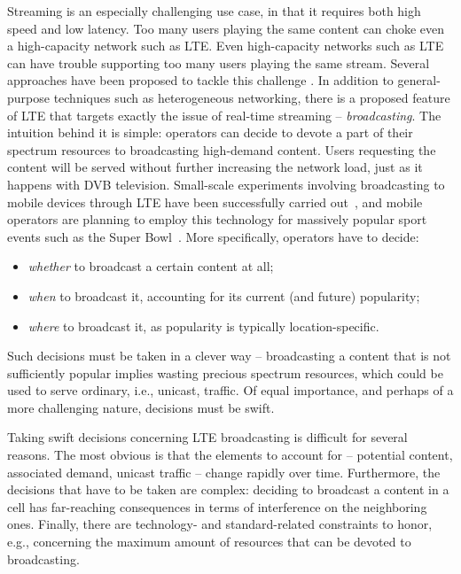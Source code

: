 \documentclass[10pt, conference, compsocconf]{IEEEtran}
\numberwithin{equation}{section}
\begin{document}
Streaming is an especially challenging use case, in that it requires both high speed and low latency. Too many
users playing the same content can choke even a high-capacity network such as LTE. Even high-capacity networks
such as LTE can have trouble supporting too many users playing the same stream.
Several approaches have been proposed to tackle this challenge \cite{noi-infocom14,hetnets}. 
In addition to general-purpose techniques such as heterogeneous networking, there is a proposed feature of LTE
that targets exactly the issue of real-time streaming -- {\em broadcasting}. The intuition behind it is simple:
operators can decide to devote a part of their spectrum resources to broadcasting high-demand content. Users
requesting the content will be served without further increasing the network load, just as it happens with
DVB television. Small-scale experiments involving broadcasting to mobile devices through LTE
have been successfully carried out~\cite{superbowl}, and mobile operators are planning to employ this technology
for massively popular sport events such as the Super Bowl~\cite{superbowl}. More specifically, operators have to decide:
\begin{itemize}
\item {\em whether} to broadcast a certain content at all;
\item {\em when} to broadcast it, accounting for its current (and future) popularity;
\item {\em where} to broadcast it, as popularity is typically location-specific.
\end{itemize}
Such decisions must be taken in a clever way -- broadcasting a content that is not sufficiently popular implies
wasting precious spectrum resources, which could be used to serve ordinary, i.e., unicast, traffic. 
Of equal importance, and perhaps of a more challenging nature, decisions must be swift.





Taking swift decisions concerning LTE broadcasting is difficult for several reasons. The most obvious is that
the elements to account for -- potential content, associated demand, unicast traffic -- change rapidly over time.
Furthermore, the decisions that have to be taken are complex: deciding to broadcast a content in a cell has
far-reaching consequences in terms of interference on the neighboring ones. Finally, there are technology-
and standard-related constraints to honor, e.g., concerning the maximum amount of resources that can be
devoted to broadcasting.
\end{document}
